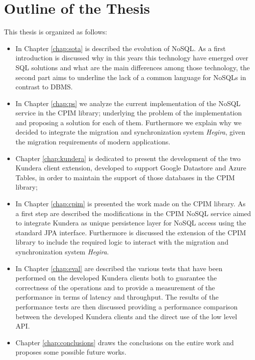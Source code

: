 \section*{Outline of the Thesis}
This thesis is organized as follows: 
\begin{itemize}
\item In Chapter \ref{chap:sota} is described the evolution of NoSQL. As a first introduction is discussed why in this years this technology have emerged over SQL solutions and what are the main differences among those technology, the second part aims to underline the lack of a common language for NoSQLs in contrast to DBMS.
\item In Chapter \ref{chap:ps} we analyze the current implementation of the NoSQL service in the CPIM library; underlying the problem of the implementation and proposing a solution for each of them. Furthermore we explain why we decided to integrate the migration and synchronization system \textit{Hegira}, given the migration requirements of modern applications.
\item Chapter \ref{chap:kundera} is dedicated to present the development of the two Kundera client extension, developed to support Google Datastore and Azure Tables, in order to maintain the support of those databases in the CPIM library;
\item In Chapter \ref{chap:cpim} is presented the work made on the CPIM library. As a first step are described the modifications in the CPIM NoSQL service aimed to integrate Kundera as unique persistence layer for NoSQL access using the standard JPA interface. Furthermore is discussed the extension of the CPIM library to include the required logic to interact with the migration and synchronization system \textit{Hegira}.
\item In Chapter \ref{chap:eval} are described the various tests that have been performed on the developed Kundera clients both to guarantee the correctness of the operations and to provide a measurement of the performance in terms of latency and throughput. The results of the performance tests are then discussed providing a performance comparison between the developed Kundera clients and the direct use of the low level API.
\item Chapter \ref{chap:conclusions} draws the conclusions on the entire work and proposes some possible future works.
\end{itemize}

